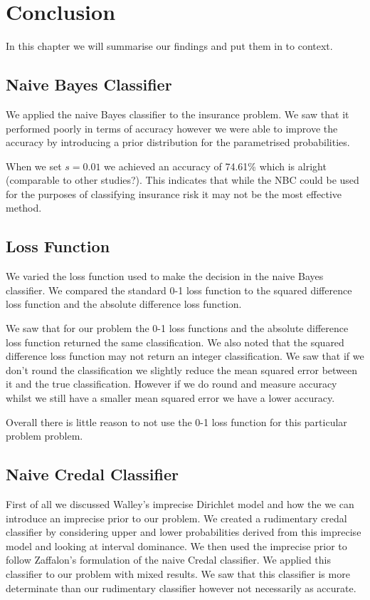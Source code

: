 \chapter{Conclusion}

In this chapter we will summarise our findings and put them in to context.

\section{Naive Bayes Classifier}

We applied the naive Bayes classifier to the insurance problem.
We saw that it performed poorly in terms of accuracy however we were able to improve the accuracy by introducing a prior distribution for the parametrised probabilities.

When we set $s=0.01$ we achieved an accuracy of 74.61\% which is alright (comparable to other studies?).
This indicates that while the NBC could be used for the purposes of classifying insurance risk it may not be the most effective method.

\section{Loss Function}

We varied the loss function used to make the decision in the naive Bayes classifier.
We compared the standard 0-1 loss function to the squared difference loss function and the absolute difference loss function.

We saw that for our problem the 0-1 loss functions and the absolute difference loss function returned the same classification.
We also noted that the squared difference loss function may not return an integer classification.
We saw that if we don't round the classification we slightly reduce the mean squared error between it and the true classification.
However if we do round and measure accuracy whilst we still have a smaller mean squared error we have a lower accuracy.

Overall there is little reason to not use the 0-1 loss function for this particular problem problem.

\section{Naive Credal Classifier}

First of all we discussed Walley's imprecise Dirichlet model and how the we can introduce an imprecise prior to our problem.
We created a rudimentary credal classifier by considering upper and lower probabilities derived from this imprecise model and looking at interval dominance.
We then used the imprecise prior to follow Zaffalon's formulation of the naive Credal classifier.
We applied this classifier to our problem with mixed results.
We saw that this classifier is more determinate than our rudimentary classifier however not necessarily as accurate.

